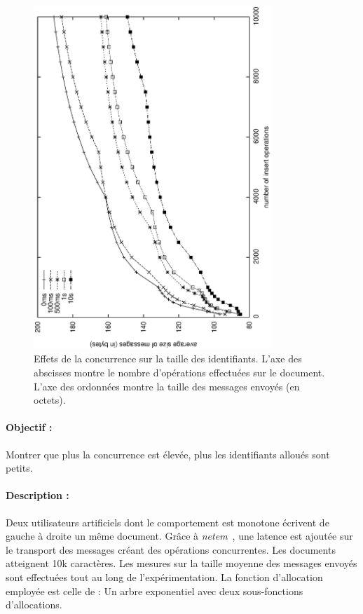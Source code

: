 \begin{figure}
  \begin{center}
    \includegraphics[angle=-90,width=0.8\textwidth]{img/lseq/latency.eps}
    \vspace{25pt}
    \caption[Effet de la concurrence sur les identifiants]
    {\label{repl:img:latency}Effets de la concurrence sur la taille des
      identifiants. L'axe des abscisses montre le nombre d'opérations effectuées
      sur le document. L'axe des ordonnées montre la taille des messages envoyés
      (en octets).}
  \end{center}
\end{figure}

\paragraph{Objectif :} Montrer que plus la concurrence est élevée, plus les
identifiants alloués sont petits.

\paragraph{Description :} Deux utilisateurs artificiels dont le comportement est
monotone écrivent de gauche à droite un même document. Grâce à
\emph{netem}~\cite{netem}, une latence est ajoutée sur le transport des
messages créant des opérations concurrentes. Les documents atteignent 10k
caractères. Les mesures sur la taille moyenne des messages envoyés sont
effectuées tout au long de l'expérimentation. La fonction d'allocation employée
est celle de \LSEQ : Un arbre exponentiel avec deux sous-fonctions
d'allocations. 

